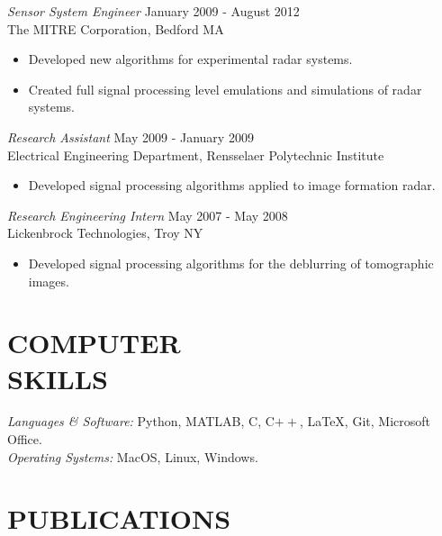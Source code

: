  {\sl Sensor System Engineer} \hfill January 2009 - August 2012\\
                The MITRE Corporation, Bedford MA 
                 	\begin{itemize}  \itemsep -2pt %
                	\item Developed new algorithms for experimental radar systems.
                	\item Created full signal processing level emulations and simulations of radar systems.
                \end{itemize}
 
                {\sl Research Assistant} \hfill            May 2009 - January 2009 \\
                Electrical Engineering Department, Rensselaer Polytechnic Institute 
                 \begin{itemize}  \itemsep -2pt %
                 \item Developed signal processing algorithms applied to image formation radar.
                 \end{itemize} 
                {\sl Research Engineering Intern} \hfill        May 2007 - May 2008\\
                Lickenbrock Technologies, Troy NY
                  \begin{itemize}
                   \item Developed signal processing algorithms for the deblurring of tomographic images.
                   \end{itemize} 
\section*{COMPUTER \\ SKILLS} {\sl Languages \& Software:} Python, MATLAB, C, C$++$, \LaTeX, Git, Microsoft Office.\\
                {\sl Operating Systems:} MacOS, Linux, Windows. 
 
\section*{PUBLICATIONS}   

